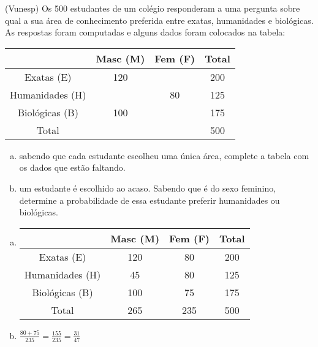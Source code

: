 \begin{ex}
(Vunesp) Os 500 estudantes de um colégio responderam a uma pergunta sobre qual a sua área de conhecimento preferida entre exatas, humanidades e biológicas. As respostas foram computadas e alguns dados foram colocados na tabela:
\begin{center}
\begin{tabular}{|c|c|c|c|} \hline
& Masc (M) & Fem (F) & Total \\  \hline
Exatas (E) & 120 &    & 200 \\  \hline
Humanidades (H) &   & 80 & 125 \\  \hline
Biológicas (B) & 100 &   & 175 \\  \hline
Total   &   &     &  500 \\  \hline
\end{tabular}
\end{center}
   \begin{enumerate}[(a)]
   \item sabendo que cada estudante escolheu uma única área, complete a tabela com os dados que estão faltando.
   \item um estudante é escolhido ao acaso. Sabendo que é do sexo feminino, determine a probabilidade de essa estudante preferir humanidades ou biológicas.
   \end{enumerate}   
     \begin{sol}
       \phantom{A} 
       \begin{enumerate} [(a)]
           \item \begin{tabular}{|c|c|c|c|} \hline
& Masc (M) & Fem (F) & Total \\  \hline
Exatas (E) & 120 & 80 & 200 \\  \hline
Humanidades (H) & 45 & 80 & 125 \\  \hline
Biológicas (B) & 100 & 75   & 175 \\  \hline
Total   & 265 & 235   &  500 \\  \hline
\end{tabular}
       \item $\frac{80+75}{235}=\frac{155}{235}=\frac{31}{47}$
       \end{enumerate}
     \end{sol}
\end{ex}